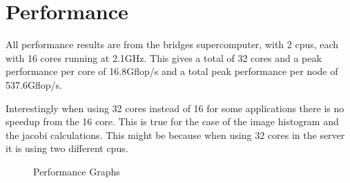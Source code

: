 \documentclass[a4paper]{article}
\begin{document}
\section*{Performance}
All performance results are from the bridges supercomputer, with 2 cpus, each with 16 cores running at 2.1GHz. This gives a total of 32 cores and a peak performance per core of 16.8Gflop/s and a total peak performance per node of 537.6Gflop/s.

Interestingly when using 32 cores instead of 16 for some applications there is no speedup from the 16 core. This is true for the case of the image histogram and the jacobi calculations. This might be because when using 32 cores in the server it is using two different cpus. 

\begin{figure}[h]
\vfill
{}
\caption{Performance Graphs}
\end{figure}
\end{document}

